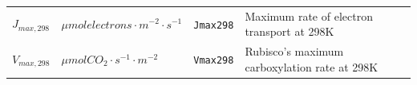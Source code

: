 \documentclass[]{book}
\begin{document}
\begin{longtable}[]{@{}llll@{}}
\begin{minipage}[t]{0.11\columnwidth}
\(J_{max, 298}\)\strut
\end{minipage} & \begin{minipage}[t]{0.10\columnwidth}\raggedright
\(\mu mol electrons \cdot m^{-2} \cdot s^{-1}\)\strut
\end{minipage} & \begin{minipage}[t]{0.12\columnwidth}\raggedright
\texttt{Jmax298}\strut
\end{minipage} & \begin{minipage}[t]{0.45\columnwidth}\raggedright
Maximum rate of electron transport at 298K\strut
\end{minipage}\tabularnewline
\begin{minipage}[t]{0.11\columnwidth}\raggedright
\(V_{max, 298}\)\strut
\end{minipage} & \begin{minipage}[t]{0.10\columnwidth}\raggedright
\(\mu mol CO_2 \cdot s^{-1} \cdot m^{-2}\)\strut
\end{minipage} & \begin{minipage}[t]{0.12\columnwidth}\raggedright
\texttt{Vmax298}\strut
\end{minipage} & \begin{minipage}[t]{0.45\columnwidth}\raggedright
Rubisco's maximum carboxylation rate at 298K\strut
\end{minipage}\tabularnewline
\bottomrule
\end{longtable}


\end{document}
